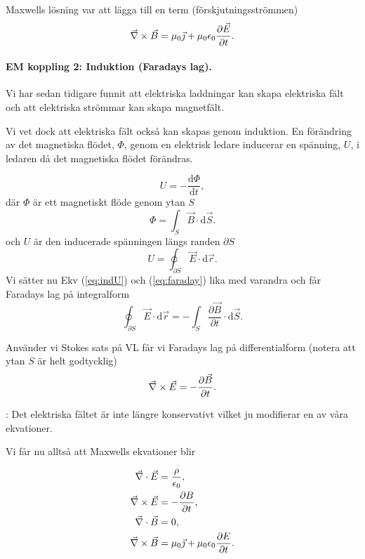\documentclass[%
oneside,                 %
final,                   %
10pt]{article}
\newcommand{\shortinlinecomment}[3]{{\color{red}{\bf #1}: #2}}
\newenvironment{summary_mdfboxadmon}[1][]{
\begin{summary_mdfboxmdframed}[frametitle=#1]
}
{
\end{summary_mdfboxmdframed}
}
\begin{document}
Maxwells lösning var att lägga till en term (förskjutningsströmmen)
\begin{equation}
  \vec{\nabla} \times \vec{B} = \mu_0 \vec{\jmath} + \mu_0 \epsilon_0 \frac{\partial \vec{E}}{\partial t}.
\end{equation}

\paragraph{EM koppling 2: Induktion (Faradays lag).}
Vi har sedan tidigare funnit att elektriska laddningar kan skapa elektriska fält  och att elektriska strömmar kan skapa magnetfält.

Vi vet dock att elektriska fält också kan skapas genom induktion.  En förändring av det magnetiska flödet, $\Phi$, genom en elektrisk ledare inducerar en spänning, $U$, i ledaren då det magnetiska flödet förändras.

\begin{equation}
  U = - \frac{\mbox{d}\Phi}{\mbox{d}t},
  \label{eq:faraday}
\end{equation}
där $\Phi$ är ett magnetiskt flöde genom ytan $S$
\begin{equation}
  \Phi = \int_S \vec{B} \cdot \mbox{d} \vec{S}.
\end{equation}
och $U$ är den inducerade spänningen längs randen $\partial S$
\begin{equation}
  U = \oint_{\partial S} \vec{E} \cdot \mbox{d}\vec{r}.
  \label{eq:indU}
\end{equation}
Vi sätter nu Ekv (\ref{eq:indU}) och (\ref{eq:faraday}) lika med varandra och får Faradays lag på integralform
$$
  \oint_{\partial S} \vec{E} \cdot \mbox{d}\vec{r} = -
\int_S \frac{\partial \vec{B}}{\partial t} \cdot \mbox{d}\vec{S}.
$$

Använder vi Stokes sats på VL får vi Faradays lag på differentialform (notera att ytan $S$ är helt godtycklig)
\begin{equation}
  \vec{\nabla} \times \vec{E} = - \frac{\partial \vec{B}}{\partial t}.
\end{equation}

\shortinlinecomment{Kommentar 3}{ Det elektriska fältet är inte längre konservativt vilket ju modifierar en av våra ekvationer. }{ Det elektriska fältet är }

Vi får nu alltså att Maxwells ekvationer blir


\begin{summary_mdfboxadmon}
\begin{align}
  \vec{\nabla} \cdot \vec{E} &= \frac{\rho}{\epsilon_0}, \\
  \vec{\nabla} \times \vec{E} &= - \frac{\partial B}{\partial t}, \\
  \vec{\nabla} \cdot \vec{B} &= 0, \\
  \vec{\nabla} \times \vec{B} &= \mu_0 \vec{\jmath} + \mu_0 \epsilon_0 
\frac{\partial E}{\partial t}.
\end{align}
\end{summary_mdfboxadmon} %
\end{document}
